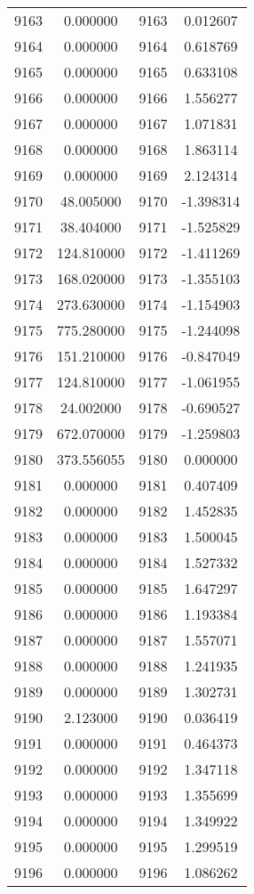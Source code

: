 \documentclass[12pt]{article}
\begin{document}
\begin{longtable}{@{}cccc@{}}
9163 & 0.000000 & 9163 & 0.012607 \\
9164 & 0.000000 & 9164 & 0.618769 \\
9165 & 0.000000 & 9165 & 0.633108 \\
9166 & 0.000000 & 9166 & 1.556277 \\
9167 & 0.000000 & 9167 & 1.071831 \\
9168 & 0.000000 & 9168 & 1.863114 \\
9169 & 0.000000 & 9169 & 2.124314 \\
9170 & 48.005000 & 9170 & -1.398314 \\
9171 & 38.404000 & 9171 & -1.525829 \\
9172 & 124.810000 & 9172 & -1.411269 \\
9173 & 168.020000 & 9173 & -1.355103 \\
9174 & 273.630000 & 9174 & -1.154903 \\
9175 & 775.280000 & 9175 & -1.244098 \\
9176 & 151.210000 & 9176 & -0.847049 \\
9177 & 124.810000 & 9177 & -1.061955 \\
9178 & 24.002000 & 9178 & -0.690527 \\
9179 & 672.070000 & 9179 & -1.259803 \\
9180 & 373.556055 & 9180 & 0.000000 \\
9181 & 0.000000 & 9181 & 0.407409 \\
9182 & 0.000000 & 9182 & 1.452835 \\
9183 & 0.000000 & 9183 & 1.500045 \\
9184 & 0.000000 & 9184 & 1.527332 \\
9185 & 0.000000 & 9185 & 1.647297 \\
9186 & 0.000000 & 9186 & 1.193384 \\
9187 & 0.000000 & 9187 & 1.557071 \\
9188 & 0.000000 & 9188 & 1.241935 \\
9189 & 0.000000 & 9189 & 1.302731 \\
9190 & 2.123000 & 9190 & 0.036419 \\
9191 & 0.000000 & 9191 & 0.464373 \\
9192 & 0.000000 & 9192 & 1.347118 \\
9193 & 0.000000 & 9193 & 1.355699 \\
9194 & 0.000000 & 9194 & 1.349922 \\
9195 & 0.000000 & 9195 & 1.299519 \\
9196 & 0.000000 & 9196 & 1.086262 \\

\end{longtable}
\end{document}
